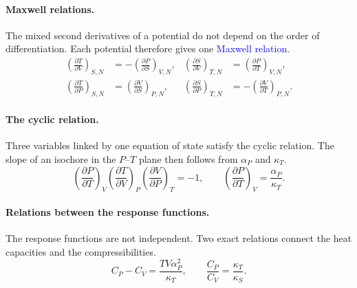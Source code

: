 \paragraph{Maxwell relations.}
The mixed second derivatives of a potential do not depend on the order of
differentiation. Each potential therefore gives one
\textcolor{blue}{Maxwell relation}.
\begin{equation}
    \boxed{
    \begin{aligned}
        \left(\frac{\partial T}{\partial V}\right)_{\!S,N}&=-\left(\frac{\partial P}{\partial S}\right)_{\!V,N}, &
        \left(\frac{\partial S}{\partial V}\right)_{\!T,N}&=\left(\frac{\partial P}{\partial T}\right)_{\!V,N},\\
        \left(\frac{\partial T}{\partial P}\right)_{\!S,N}&=\left(\frac{\partial V}{\partial S}\right)_{\!P,N}, &
        \left(\frac{\partial S}{\partial P}\right)_{\!T,N}&=-\left(\frac{\partial V}{\partial T}\right)_{\!P,N}.
    \end{aligned}}
\end{equation}

\paragraph{The cyclic relation.}
Three variables linked by one equation of state satisfy the cyclic
relation. The slope of an isochore in the $P$--$T$ plane then follows from
$\alpha_P$ and $\kappa_T$.
\begin{equation}
    \boxed{\left(\frac{\partial P}{\partial T}\right)_{\!V}
    \left(\frac{\partial T}{\partial V}\right)_{\!P}
    \left(\frac{\partial V}{\partial P}\right)_{\!T}=-1,
    \qquad
    \left(\frac{\partial P}{\partial T}\right)_{\!V}=\frac{\alpha_P}{\kappa_T}.}
\end{equation}

\paragraph{Relations between the response functions.}
The response functions are not independent. Two exact relations connect
the heat capacities and the compressibilities.
\begin{equation}
    \boxed{C_P-C_V=\frac{TV\alpha_P^2}{\kappa_T},\qquad
    \frac{C_P}{C_V}=\frac{\kappa_T}{\kappa_S}.}
\end{equation}

